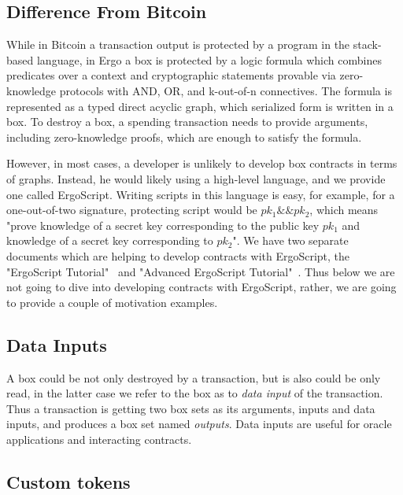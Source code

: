 \subsection{Difference From Bitcoin}


 While in Bitcoin a transaction output is protected by a program in the stack-based language, in Ergo a
 box is protected by a logic formula which combines predicates over a context and cryptographic statements provable
 via zero-knowledge protocols with AND, OR, and k-out-of-n connectives. The formula is represented as a typed direct
 acyclic graph, which serialized form is written in a box. To destroy a box, a spending transaction needs to provide
 arguments, including zero-knowledge proofs, which are enough to satisfy the formula.

 However, in most cases, a developer is unlikely to develop box contracts in terms of graphs. Instead, he would likely
 using a high-level language, and we provide one called ErgoScript. Writing scripts in this language is easy, for
 example, for a one-out-of-two signature, protecting script would be ${pk_1 \&\& pk_2}$, which means "prove knowledge of
 a secret key corresponding to the public key $pk_1$ and knowledge of a secret key corresponding to $pk_2$". We have
 two separate documents which are helping to develop contracts with ErgoScript, the "ErgoScript Tutorial"~\cite{ergoTutorial}
 and "Advanced ErgoScript Tutorial"~\cite{ergoAdvTutorial}. Thus below we are not going to dive into developing contracts with
 ErgoScript, rather, we are going to provide a couple of motivation examples.

\subsection{Data Inputs}
 \label{sec:data-inputs}

 A box could be not only destroyed by a transaction, but is also could be only read, in the latter case we refer to the
 box as to {\em data input} of the transaction. Thus a transaction is getting two box sets as its arguments, inputs and
 data inputs, and produces a box set named {\em outputs}. Data inputs are useful for oracle applications and interacting
 contracts.

\subsection{Custom tokens}
 \label{sec:custom tokens}

